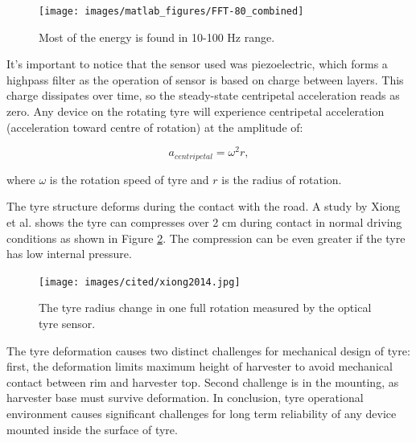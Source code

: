 \begin{figure}[htb]
\begin{center}
\texttt{[image: images/matlab\_figures/FFT-80\_combined]}
\end{center}
\caption{Most of the energy is found in 10-100 Hz range.}
\label{80_FFT_zoom}
\end{figure}

It's important to notice that the sensor used was piezoelectric, which forms a highpass filter as the operation of sensor is based on charge between layers. This charge dissipates over time, so the steady-state centripetal acceleration reads as zero. Any device on the rotating tyre will experience centripetal acceleration (acceleration toward centre of rotation) at the amplitude of: 

\begin{equation}
  a_{centripetal} = \omega^2 r,
\end{equation}

where $\omega$ is the rotation speed of tyre and $r$ is the radius of rotation.

The tyre structure deforms during the contact with the road. A study by Xiong et al. \cite{Xiong2014} shows the tyre can compresses over 2 cm during contact in normal driving conditions as shown in Figure \ref{fig:deformation}. The compression can be even greater if the tyre has low internal pressure. 

\begin{figure}[htb]
    \begin{center}
    \texttt{[image: images/cited/xiong2014.jpg]}
    \end{center}
    \caption{\label{fig:deformation} The tyre radius change in one full rotation measured by the optical tyre sensor. \cite{Xiong2014}}
\end{figure}

The tyre deformation causes two distinct challenges for mechanical design of tyre: first, the deformation limits maximum height of harvester to avoid mechanical contact between rim and harvester top. Second challenge is in the mounting, as harvester base must survive deformation. In conclusion, tyre operational environment causes significant challenges for long term reliability of any device mounted inside the surface of tyre. 
